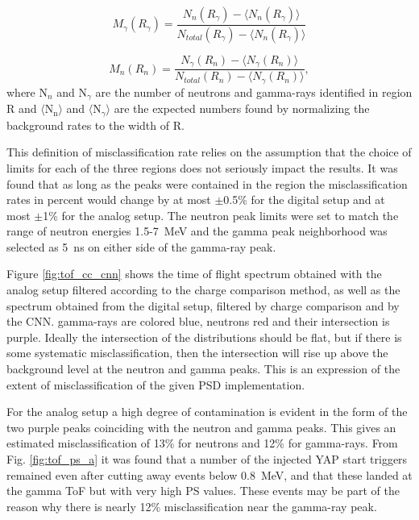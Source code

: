 \documentclass[main.tex]{subfiles}
\begin{document}
\begin{equation}
	M_\gamma(R_\gamma) = \frac{N_{n}(R_\gamma)-\langle N_n(R_\gamma)\rangle}{N_{total}(R_\gamma)-\langle N_n(R_\gamma)\rangle}
\end{equation}

\begin{equation}
	M_n(R_n) = \frac{N_{\gamma}(R_n)-\langle N_\gamma(R_n)\rangle}{N_{total}(R_n)-\langle N_\gamma(R_n)\rangle},
\end{equation}
where N$_n$ and N$_\gamma$ are the number of neutrons and gamma-rays identified in region R and $\langle \textrm{N}_\textrm{n}\rangle$ and $\langle \textrm{N}_\gamma\rangle$ are the expected numbers found by normalizing the background rates to the width of R.

This definition of misclassification rate relies on the assumption that the choice of limits for each of the three regions does not seriously impact the results. It was found that as long as the peaks were contained in the region the misclassification rates in percent would change by at most $\pm$0.5\% for the digital setup and at most $\pm$1\% for the analog setup. The neutron peak limits were set to match the range of neutron energies 1.5-\SI{7}{\MeV} and the gamma peak neighborhood was selected as \SI{5}{\ns} on either side of the gamma-ray peak.

Figure \ref{fig:tof_cc_cnn} shows the time of flight spectrum obtained with the analog setup filtered according to the charge comparison method, as well as the spectrum obtained from the digital setup, filtered by charge comparison and by the CNN. gamma-rays are colored blue, neutrons red and their intersection is purple. Ideally the intersection of the distributions should be flat, but if there is some systematic misclassification, then the intersection will rise up above the background level at the neutron and gamma peaks. This is an expression of the extent of misclassification of the given PSD implementation.

For the analog setup a high degree of contamination is evident in the form of the two purple peaks coinciding with the neutron and gamma peaks. This gives an estimated misclassification of 13\% for neutrons and 12\% for gamma-rays. From Fig. \ref{fig:tof_ps_a} it was found that a number of the injected YAP start triggers remained even after cutting away events below \SI{0.8}{\MeV}, and that these landed at the gamma ToF but with very high PS values. These events may be part of the reason why there is nearly 12\% misclassification near the gamma-ray peak.
\end{document}
